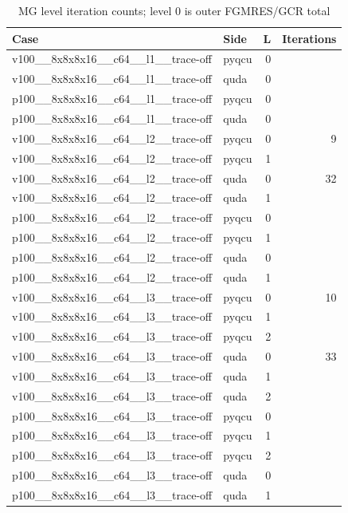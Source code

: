 \begin{table}[htbp]
\centering
\caption{MG level iteration counts; level 0 is outer FGMRES/GCR total}
\small
\begin{tabular}{@{}llrr@{}}
\toprule
Case & Side & L & Iterations \\
\midrule
v100\_\_8x8x8x16\_\_c64\_\_l1\_\_trace-off & pyqcu & 0 &  \\
v100\_\_8x8x8x16\_\_c64\_\_l1\_\_trace-off & quda & 0 &  \\
p100\_\_8x8x8x16\_\_c64\_\_l1\_\_trace-off & pyqcu & 0 &  \\
p100\_\_8x8x8x16\_\_c64\_\_l1\_\_trace-off & quda & 0 &  \\
v100\_\_8x8x8x16\_\_c64\_\_l2\_\_trace-off & pyqcu & 0 & 9 \\
v100\_\_8x8x8x16\_\_c64\_\_l2\_\_trace-off & pyqcu & 1 &  \\
v100\_\_8x8x8x16\_\_c64\_\_l2\_\_trace-off & quda & 0 & 32 \\
v100\_\_8x8x8x16\_\_c64\_\_l2\_\_trace-off & quda & 1 &  \\
p100\_\_8x8x8x16\_\_c64\_\_l2\_\_trace-off & pyqcu & 0 &  \\
p100\_\_8x8x8x16\_\_c64\_\_l2\_\_trace-off & pyqcu & 1 &  \\
p100\_\_8x8x8x16\_\_c64\_\_l2\_\_trace-off & quda & 0 &  \\
p100\_\_8x8x8x16\_\_c64\_\_l2\_\_trace-off & quda & 1 &  \\
v100\_\_8x8x8x16\_\_c64\_\_l3\_\_trace-off & pyqcu & 0 & 10 \\
v100\_\_8x8x8x16\_\_c64\_\_l3\_\_trace-off & pyqcu & 1 &  \\
v100\_\_8x8x8x16\_\_c64\_\_l3\_\_trace-off & pyqcu & 2 &  \\
v100\_\_8x8x8x16\_\_c64\_\_l3\_\_trace-off & quda & 0 & 33 \\
v100\_\_8x8x8x16\_\_c64\_\_l3\_\_trace-off & quda & 1 &  \\
v100\_\_8x8x8x16\_\_c64\_\_l3\_\_trace-off & quda & 2 &  \\
p100\_\_8x8x8x16\_\_c64\_\_l3\_\_trace-off & pyqcu & 0 &  \\
p100\_\_8x8x8x16\_\_c64\_\_l3\_\_trace-off & pyqcu & 1 &  \\
p100\_\_8x8x8x16\_\_c64\_\_l3\_\_trace-off & pyqcu & 2 &  \\
p100\_\_8x8x8x16\_\_c64\_\_l3\_\_trace-off & quda & 0 &  \\
p100\_\_8x8x8x16\_\_c64\_\_l3\_\_trace-off & quda & 1 &  \\

\end{tabular}
\end{table}
